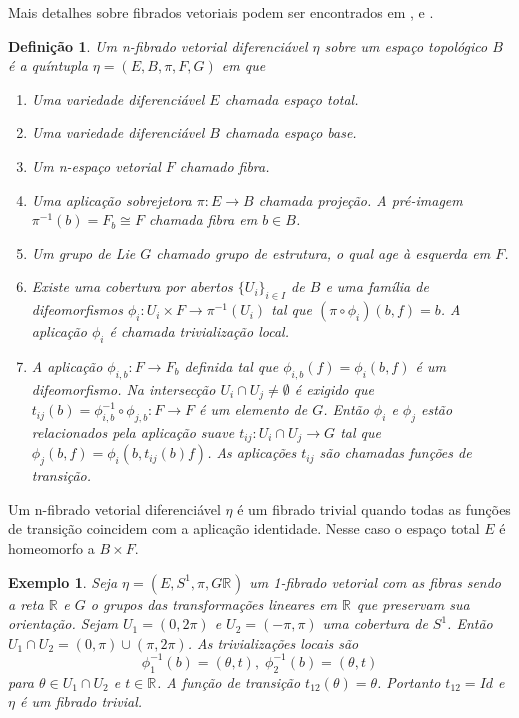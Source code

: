 \documentclass[12pt]{book}
\newtheorem{definicao}[teorema]{Definição}
\newtheorem{exemplo}[teorema]{Exemplo}
\newcommand{\circulo}{S^{1}}
\newcommand{\real}[1]{\mathbb{R}^{#1}}
\newcommand{\reta}{\real{}}
\begin{document}
	Mais detalhes sobre fibrados vetoriais podem ser encontrados em \cite{husemoller_fibrados}, \cite{nakahara} e \cite{steenrod_fibre_bundles}.
	
	\begin{definicao}
		Um n-fibrado vetorial diferenciável $\eta$ sobre um espaço topológico $B$ é a quíntupla $\eta = (E, B, \pi, F, G)$ em que
		
		\begin{enumerate}
			\item Uma variedade diferenciável $E$ chamada espaço total.
			
			\item Uma variedade diferenciável $B$ chamada espaço base.
			
			\item Um n-espaço vetorial $F$ chamado fibra.
			
			\item Uma aplicação sobrejetora $\pi: E\to B$ chamada projeção. A pré-imagem $\pi^{-1}(b) = F_{b} \cong F$ chamada fibra em $b\in B$. 
			
			\item Um grupo de Lie $G$ chamado grupo de estrutura, o qual age à esquerda em $F$.
			
			\item Existe uma cobertura por abertos $\{U_{i}\}_{i\in I}$ de $B$ e uma família de difeomorfismos $\phi_{i}: U_{i}\times F\to \pi^{-1}(U_{i})$ tal que $(\pi\circ \phi_{i})(b,f) = b$. A aplicação $\phi_{i}$ é chamada trivialização local.
			
			\item A aplicação $\phi_{i,b}: F\to F_{b}$ definida tal que $\phi_{i,b}(f) = \phi_{i}(b,f)$ é um difeomorfismo. Na intersecção $U_{i}\cap U_{j}\neq \emptyset$ é exigido que $t_{ij}(b)=\phi_{i,b}^{-1}\circ \phi_{j,b}:F\to F$ é um elemento de $G$. Então $\phi_{i}$ e $\phi_{j}$ estão relacionados pela aplicação suave $t_{ij}: U_{i}\cap U_{j}\to G$ tal que $\phi_{j}(b, f) = \phi_{i}(b, t_{ij}(b)f)$. As aplicações $t_{ij}$ são chamadas funções de transição.
		\end{enumerate}
		
	\end{definicao}
	
	Um n-fibrado vetorial diferenciável $\eta$ é um fibrado trivial quando todas as funções de transição coincidem com a aplicação identidade. Nesse caso o espaço total $E$ é homeomorfo a $B\times F$.
	
	\begin{exemplo}\label{exemplo_fibrado_circulo}
		Seja $\eta=(E, \circulo,\pi, G \reta)$ um 1-fibrado vetorial com as fibras sendo a reta $\reta$ e $G$ o grupos das transformações lineares em $\reta$ que preservam sua orientação. Sejam $U_{1} = (0,2\pi)$ e $U_{2} = (-\pi,\pi)$ uma cobertura de $\circulo$. Então $U_{1}\cap U_{2} =(0,\pi)\cup(\pi,2\pi)$. As trivializações locais são 
		$$
		\phi^{-1}_{1}(b) = (\theta, t),\; 		\phi^{-1}_{2}(b) = (\theta, t)
		$$
		para $\theta\in U_{1}\cap U_{2}$ e $t\in \reta$. A função de transição $t_{12}(\theta) = \theta$. Portanto $t_{12}=Id$ e $\eta$ é um fibrado trivial.
	\end{exemplo}
	
\end{document}
